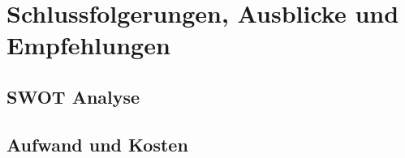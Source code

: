 \chapter{Schlussfolgerungen, Ausblicke und Empfehlungen}

\section{SWOT Analyse}

\section{Aufwand und Kosten}